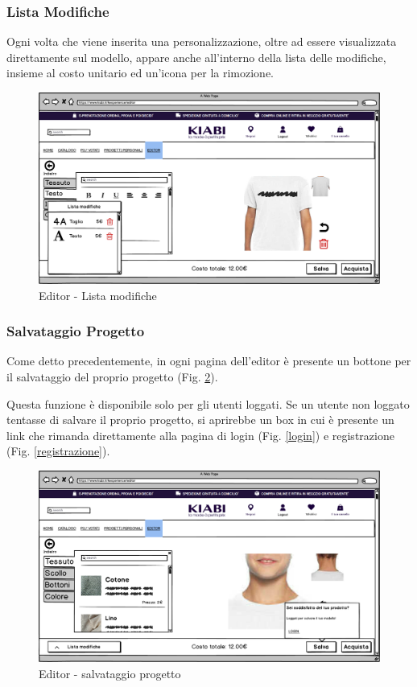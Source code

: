 \documentclass[12pt,italian,]{report}
\begin{document}
\newpage
\subsubsection{Lista Modifiche} 

Ogni volta che viene inserita una personalizzazione, oltre ad essere visualizzata direttamente sul modello, appare anche all'interno della lista delle modifiche, insieme al costo unitario ed un'icona per la rimozione.

\begin{figure}[h]
\centering
\includegraphics{../../balsamiq/balsamiq_finale/Editor-caratteristicabustotesto4.png}
\caption{Editor - Lista modifiche}
\label{editor_listamod}
\end{figure}


\newpage
\subsubsection{Salvataggio Progetto} 

Come detto precedentemente, in ogni pagina dell'editor è presente un bottone per il salvataggio del proprio progetto (Fig. \ref{editor_salva}). 

Questa funzione è disponibile solo per gli utenti loggati. Se un utente non loggato tentasse di salvare il proprio progetto, si aprirebbe un box in cui è presente un link che rimanda direttamente alla pagina di login (Fig. \ref{login}) e registrazione (Fig. \ref{registrazione}).

\begin{figure}[h]
\centering
\includegraphics{../../balsamiq/balsamiq_finale/Editor-caratteristicacollotessutononloggato.png}
\caption{Editor - salvataggio progetto}
\label{editor_salva}
\end{figure}
\end{document}
